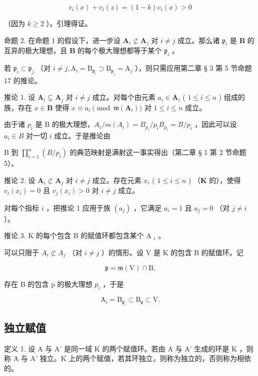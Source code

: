 \[
v _ {i} (x) + v _ {i} (z) = (1 - k) v _ {i} (x) > 0
\]

（因为 \(k \geqslant 2\) ）。引理得证。

命题 2. 在命题 1 的假设下，进一步设 \(\mathbf{A}_i \not\subset \mathbf{A}_j\) 对 \(i \neq j\) 成立。那么诸 \(\mathfrak{p}_i\) 是 \(\mathbf{B}\) 的互异的极大理想，且 \(\mathbf{B}\) 的每个极大理想都等于某个 \(\mathfrak{p}_i\) 。

若 \(\mathfrak{p}_i\subset \mathfrak{p}_j\) （对 \(i\neq j,\mathrm{A}_i = \mathrm{B}_{\mathfrak{p}_i}\supset \mathrm{B}_{\mathfrak{p}_j} = \mathrm{A}_j\) ），则只需应用第二章 § 3 第 5 节命题 17 的推论。

推论 1. 设 \(\mathbf{A}_i \subsetneq \mathbf{A}_j\) 对 \(i \neq j\) 成立。对每个由元素 \(a_i \in \mathbf{A}_i\) ( \(1 \leqslant i \leqslant n\) ) 组成的族，存在 \(x \in \mathbf{B}\) 使得 \(x \equiv a_i \pmod{\mathfrak{m}(\mathbf{A}_i)}\) 对 \(1 \leqslant i \leqslant n\) 成立。

由于诸 \(p_i\) 是 B 的极大理想，\(A_i / m(A_i) = B_{p_i} / p_i B_{p_i} = B / p_i\) ，因此可以设 \(a_i \in B\) 对一切 \(i\) 成立。于是推论由

B 到 \(\prod_{i=1}^{n} (B/p_i)\) 的典范映射是满射这一事实得出（第二章 § 1 第 2 节命题 5）。

推论 2. 设 \(\mathbf{A}_i \not\subset \mathbf{A}_j\) 对 \(i \neq j\) 成立。存在元素 \(x_i\) ( \(1 \leqslant i \leqslant n\) ) （\(\mathbf{K}\) 的），使得 \(v_i(x_i) = 0\) 且 \(v_j(x_i) > 0\) 对 \(i \neq j\) 成立。

对每个指标 \(i\) ，把推论 1 应用于族 \((a_{j})\) ，它满足 \(a_{i} = 1\) 且 \(a_{j} = 0\) （对 \(j \neq i\) ）。

推论 3. K 的每个包含 B 的赋值环都包含某个 A \(_{i}\) 。

可以只限于 \(A_{i} \not\subset A_{j}\) （对 \(i \neq j\) ）的情形。设 V 是 K 的包含 B 的赋值环。记

\[
\mathfrak {p} = \mathfrak {m} (\mathrm{V}) \cap \mathrm{B}.
\]

存在 B 的包含 p 的极大理想 \(p_{i}\) ，于是

\[
\mathrm{A} _ {i} = \mathrm{B} _ {\mathfrak {p} _ {i}} \subset \mathrm{B} _ {\mathfrak {p}} \subset \mathrm{V}.
\]

\subsection{独立赋值}

定义 1. 设 A 与 A' 是同一域 K 的两个赋值环。若由 A 与 A' 生成的环是 K ，则称 A 与 A' 独立。K 上的两个赋值，若其环独立，则称为独立的，否则称为相依的。

